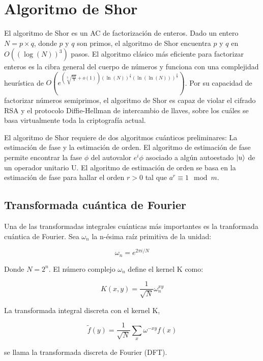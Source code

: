 \chapter{Algoritmo de Shor}
El algoritmo de Shor es un AC de factorización de enteros. Dado un entero $N=p \times q$, donde $p$ y $q$ son primos, el algoritmo de Shor encuentra $p$ y $q$ en $O((\log(N))^3)$ pasos. El algoritmo clásico más eficiente para factorizar enteros es la cibra general del cuerpo de números y funciona con una complejidad heurística de $O(e^{(\sqrt[3]{\frac{64}{9}}+o(1))(\ln(N))^{\frac{1}{3}}(\ln(\ln(N)))^{\frac{2}{3}}})$. Por su capacidad de factorizar números semiprimos, el algoritmo de Shor es capaz de violar el cifrado RSA y el protocolo Diffie-Hellman de intercambio de llaves, sobre los cuáles se basa virtualmente toda la criptografía actual.

El algoritmo de Shor requiere de dos algoritmos cuánticos preliminares: La estimación de fase y la estimación de orden. El algoritmo de estimación de fase permite encontrar la fase $\phi$ del autovalor $e^i \phi$ asociado a algún autoestado $\ket{u}$ de un operador unitario U. El algoritmo de estimación de orden se basa en la estimación de fase para hallar el orden $r>0$ tal que $a^r \equiv 1 \mod m$.

\section{Transformada cuántica de Fourier}

Una de las transformadas integrales cuánticas más importantes es la tranformada cuántica de Fourier. Sea $\omega_n$ la n-ésima raíz primitiva de la unidad:

\begin{equation}
    \omega_n = e^{2\pi i/N}
\end{equation}

Donde $N = 2^n$. El número complejo $\omega_n$ define el kernel K como:

\begin{equation}
    K(x,y) = \frac{1}{\sqrt{N}} \omega_n^{x y}
\end{equation}

La transformada integral discreta con el kernel K,

\begin{equation}
    \tilde{f}(y) = \frac{1}{\sqrt{N}} \sum\limits_x \omega^{-x y} f(x)
\end{equation}

se llama la transformada discreta de Fourier (DFT).

